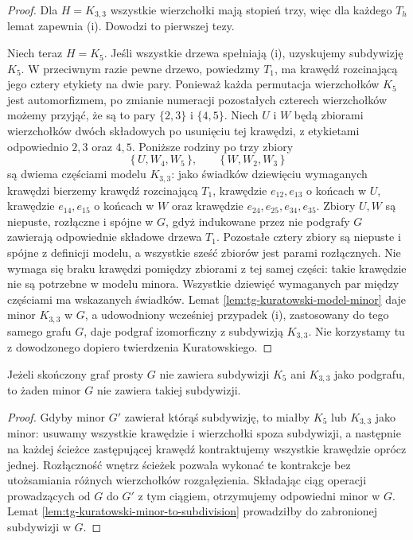 \begin{proof}
Dla $H=K_{3,3}$ wszystkie
wierzchołki mają stopień
trzy, więc dla każdego
$T_h$ lemat zapewnia (i).
Dowodzi to pierwszej tezy.

Niech teraz $H=K_5$.
Jeśli wszystkie drzewa
spełniają (i), uzyskujemy
subdywizję $K_5$.
W przeciwnym razie
pewne drzewo, powiedzmy
$T_1$, ma krawędź rozcinającą jego cztery etykiety
na dwie pary. Ponieważ każda permutacja wierzchołków
$K_5$ jest automorfizmem, po zmianie numeracji
pozostałych czterech wierzchołków możemy przyjąć,
że są to pary $\{2,3\}$ i $\{4,5\}$.
Niech $U$ i $W$ będą
zbiorami wierzchołków
dwóch składowych po
usunięciu tej krawędzi,
z etykietami odpowiednio
$2,3$ oraz $4,5$.
Poniższe rodziny po
trzy zbiory
\[
\{\,U,W_4,W_5\,\},
\qquad
\{\,W,W_2,W_3\,\}
\]
są dwiema częściami
modelu $K_{3,3}$:
jako świadków dziewięciu wymaganych krawędzi
bierzemy krawędź rozcinającą $T_1$, krawędzie
$e_{12},e_{13}$ o końcach w $U$, krawędzie
$e_{14},e_{15}$ o końcach w $W$ oraz krawędzie
$e_{24},e_{25},e_{34},e_{35}$.
Zbiory $U,W$ są niepuste, rozłączne i spójne
w $G$, gdyż indukowane przez nie podgrafy $G$
zawierają odpowiednie składowe drzewa $T_1$.
Pozostałe cztery zbiory są niepuste i spójne
z definicji modelu, a wszystkie sześć zbiorów
jest parami rozłącznych. Nie wymaga się braku
krawędzi pomiędzy zbiorami z tej samej części:
takie krawędzie nie są potrzebne w modelu minora.
Wszystkie dziewięć wymaganych par między częściami
ma wskazanych świadków. Lemat
\ref{lem:tg-kuratowski-model-minor} daje minor $K_{3,3}$
w $G$, a udowodniony wcześniej przypadek (i),
zastosowany do tego samego grafu $G$, daje podgraf
izomorficzny z subdywizją $K_{3,3}$. Nie korzystamy
tu z dowodzonego dopiero twierdzenia Kuratowskiego.
\end{proof}

\begin{wniosek}
\label{cor:tg-kuratowski-minor-heredity}
Jeżeli skończony graf prosty $G$
nie zawiera subdywizji $K_5$
ani $K_{3,3}$ jako podgrafu,
to żaden minor $G$
nie zawiera takiej subdywizji.
\end{wniosek}
\begin{proof}
Gdyby minor $G'$ zawierał
którąś subdywizję,
to miałby $K_5$ lub $K_{3,3}$ jako minor:
usuwamy wszystkie krawędzie i wierzchołki spoza
subdywizji, a następnie na każdej ścieżce
zastępującej krawędź kontraktujemy wszystkie
krawędzie oprócz jednej. Rozłączność wnętrz
ścieżek pozwala wykonać te kontrakcje bez
utożsamiania różnych wierzchołków rozgałęzienia.
Składając ciąg operacji prowadzących od $G$ do $G'$
z tym ciągiem, otrzymujemy odpowiedni minor w $G$.
Lemat
\ref{lem:tg-kuratowski-minor-to-subdivision}
prowadziłby do zabronionej
subdywizji w $G$.
\end{proof}


